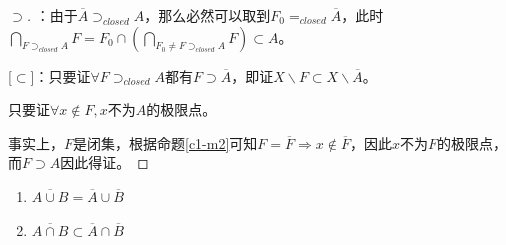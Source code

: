 \documentclass[lang=cn,10pt,device=pad]{elegantbook}
\newcommand{\dajiao}{\displaystyle\bigcap}
\newcommand{\xkh}[1]{\left(#1\right)}
\newcommand{\chadiao}{\backslash}
\begin{document}
\begin{proof}
	[$\supset$]：由于$\overline{A}\supset_{closed}A$，那么必然可以取到$F_{0} =_{closed} \overline{A}$，此时$\dajiao_{F\supset_{closed}A} F = F_{0}\cap\xkh{\dajiao_{F_{0} \neq F\supset_{closed}A} F}\subset A$。
	
	
	[$\subset$]：只要证$\forall F\supset_{closed} A$都有$F\supset \overline{A}$，即证$X\chadiao F\subset X\chadiao \overline{A}$。
	
	只要证$\forall x \notin F , x$不为$A$的极限点。
	
	事实上，$F$是闭集，根据命题\ref{c1-m2}可知$F =\overline{F} \Rightarrow x\notin \overline{F}$，因此$x$不为$F$的极限点，而$F\supset{A}$因此得证。
\end{proof}

\begin{proposition}[闭包运算的性质]
	\begin{enumerate}
		\item $\overline{A\cup B} = \overline{A}\cup \overline{B}$
		\item $\overline{A\cap B} \subset \overline{A}\cap \overline{B}$ 
	\end{enumerate}
\end{proposition}
\end{document}
